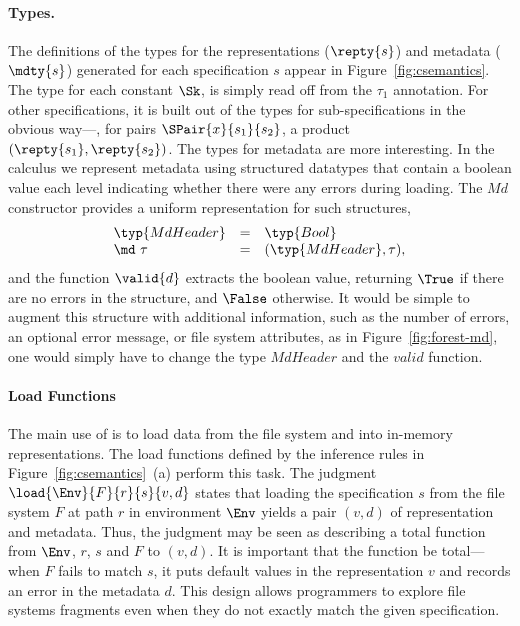 \paragraph*{Types.}
%
The definitions of the types for the representations ($\repty{s}$) and
metadata ($\mdty{s}$) generated for each specification $s$ appear in
Figure~\ref{fig:csemantics}. The type for each constant $\Sk$, is
simply read off from the $\tau_1$ annotation. For other
specifications, it is built out of the types for sub-specifications in
the obvious way---\eg, for pairs $\SPair{x}{s_1}{s_2}$, a product
$(\repty{s_1}, \repty{s_2})$. The types for metadata are more
interesting.  In the \forest{} calculus we represent metadata using
structured datatypes that contain a boolean value each level
indicating whether there were any errors during loading. The
$\mathit{Md}$ constructor provides a uniform representation for such
structures,
\[
\begin{array}{lcl}
\typ{MdHeader} & = & \typ{Bool} \\
\md~{\tau} & = & (\typ{MdHeader}, \tau),
\end{array}
\]
and the function $\valid{d}$ extracts the boolean value, returning
$\True$ if there are no errors in the structure, and $\False$
otherwise. It would be simple to augment this structure with
additional information, such as the number of errors, an optional
error message, or file system attributes, as in
Figure~\ref{fig:forest-md}, one would simply have to change the type
$\mathit{MdHeader}$ and the $\mathit{valid}$ function.

\paragraph*{Load Functions}
%
The main use of \forest{} is to load data from the file system and
into in-memory representations. The load functions defined by the
inference rules in Figure~\ref{fig:csemantics}~(a) perform this task.
The judgment $\load{\Env}{F}{r}{s}{v,d}$ states that loading the
specification $s$ from the file system $F$ at path $r$ in environment
$\Env$ yields a pair $(v,d)$ of representation and metadata. Thus, the
judgment may be seen as describing a total function from $\Env$, $r$,
$s$ and $F$ to $(v,d)$. It is important that the function be
total---when $F$ fails to match $s$, it puts default values in the
representation $v$ and records an error in the metadata $d$. This
design allows programmers to explore file systems fragments even when
they do not exactly match the given specification.


